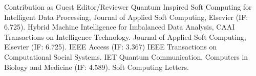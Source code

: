 \begin{rubric}{Contribution as Guest Editor/Reviewer}
\entry*[2022-present] Quantum Inspired Soft Computing for Intelligent Data Processing, Journal of Applied Soft Computing, Elsevier (IF: 6.725).
\entry*[2019-2020] Hybrid Machine Intelligence for Imbalanced Data Analysis, CAAI Transactions on Intelligence Technology.
\entry*[2016-present] Journal of Applied Soft Computing, Elsevier (IF: 6.725).
\entry*[2020-present] IEEE Access (IF: 3.367)
\entry*[2021-present] IEEE Transactions on Computational Social Systems.
\entry*[2021-present] IET Quantum Communication.
\entry*[2021-present] Computers in Biology and Medicine (IF: 4.589).
\entry*[2021-present] Soft Computing Letters.
\end{rubric}